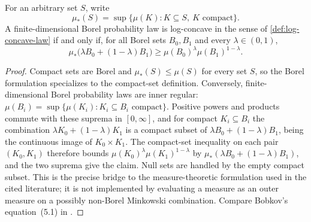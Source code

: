 \begin{theorem}
  \label{thm:compact-borell-logconcavity-equivalence}
  \leanok
  For an arbitrary set $S$, write
  \[
    \mu_*(S)=\sup\{\mu(K):K\subseteq S,\ K\text{ compact}\}.
  \]
  A finite-dimensional Borel probability law is log-concave in the sense of
  \cref{def:log-concave-law} if and only if, for all Borel sets $B_0,B_1$ and every
  $\lambda\in(0,1)$,
  \[
    \mu_*\bigl(\lambda B_0+(1-\lambda)B_1\bigr)
      \ge \mu(B_0)^\lambda\mu(B_1)^{1-\lambda}.
  \]
\end{theorem}
\begin{proof}
  \leanok
  Compact sets are Borel and $\mu_*(S)\le\mu(S)$ for every set $S$, so the Borel formulation
  specializes to the compact-set definition.  Conversely, finite-dimensional Borel probability
  laws are inner regular: $\mu(B_i)=\sup\{\mu(K_i):K_i\subseteq B_i\text{ compact}\}$.
  Positive powers and products commute with these suprema in $[0,\infty]$, and for compact
  $K_i\subseteq B_i$ the combination $\lambda K_0+(1-\lambda)K_1$ is a compact subset of
  $\lambda B_0+(1-\lambda)B_1$, being the continuous image of $K_0\times K_1$.  The compact-set
  inequality on each pair $(K_0,K_1)$ therefore bounds $\mu(K_0)^\lambda\mu(K_1)^{1-\lambda}$ by
  $\mu_*(\lambda B_0+(1-\lambda)B_1)$, and the two suprema give the claim.  Null sets are handled
  by the empty compact subset.  This is the precise bridge to the measure-theoretic formulation
  used in the cited literature; it is not implemented by evaluating a measure as an outer measure
  on a possibly non-Borel Minkowski combination.  Compare Bobkov's equation~(5.1) in
  \cite{Bobkov1999LogConcave}.
\end{proof}

